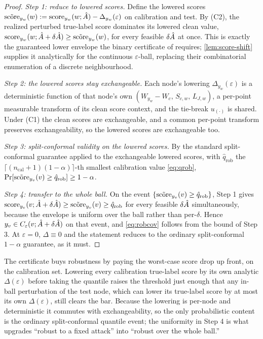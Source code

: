 \begin{proof}
\emph{Step 1: reduce to lowered scores.}
Define the lowered scores
$\tilde{\mathrm{score}}_{y_w}(w):=\mathrm{score}_{y_w}(w;\hat{A})-\Delta_{y_w}(\varepsilon)$ on calibration and test. By
(C2), the realized perturbed true-label score dominates its lowered clean value,
$\mathrm{score}_{y_w}(w;\hat{A}+\delta\hat{A})\ge\tilde{\mathrm{score}}_{y_w}(w)$, for every feasible $\delta\hat{A}$ at once.
This is exactly the guaranteed lower envelope the binary certificate of \citet{zargarbashi2023conformal}
requires; \cref{lem:score-shift} supplies it analytically for the continuous $\varepsilon$-ball,
replacing their combinatorial enumeration of a discrete neighbourhood.

\emph{Step 2: the lowered scores stay exchangeable.}
Each node's lowering $\Delta_{y_w}(\varepsilon)$ is a deterministic function of that node's own
$(W_{y_w}-W_c,\,S_{c,w},\,L_{J,w})$, a per-point measurable transform of its clean score context, and
the tie-break $u_{(\cdot)}$ is shared. Under (C1) the clean scores are exchangeable, and a common
per-point transform preserves exchangeability, so the lowered scores are exchangeable too.

\emph{Step 3: split-conformal validity on the lowered scores.}
By the standard split-conformal guarantee \citep{vovk2005algorithmic} applied to the exchangeable
lowered scores, with $\hat q_{\mathrm{rob}}$ the $\lceil(n_{\mathrm{cal}}+1)(1-\alpha)\rceil$-th smallest
calibration value \eqref{eq:qrob}, $\Pr[\tilde{\mathrm{score}}_{y_v}(v)\ge\hat q_{\mathrm{rob}}]\ge1-\alpha$.

\emph{Step 4: transfer to the whole ball.}
On the event $\{\tilde{\mathrm{score}}_{y_v}(v)\ge\hat q_{\mathrm{rob}}\}$, Step 1 gives
$\mathrm{score}_{y_v}(v;\hat{A}+\delta\hat{A})\ge\tilde{\mathrm{score}}_{y_v}(v)\ge\hat q_{\mathrm{rob}}$ for every feasible
$\delta\hat{A}$ simultaneously, because the envelope is uniform over the ball rather than per-$\delta$.
Hence $y_v\in C_\varepsilon(v;\hat{A}+\delta\hat{A})$ on that event, and \eqref{eq:robcov} follows from
the bound of Step 3. At $\varepsilon=0$, $\Delta\equiv0$ and the statement reduces to the ordinary
split-conformal $1-\alpha$ guarantee, as it must.
\end{proof}

The certificate buys robustness by paying the worst-case score drop up front, on the calibration set.
Lowering every calibration true-label score by its own analytic $\Delta(\varepsilon)$ before taking the
quantile raises the threshold just enough that any in-ball perturbation of the test node, which can
lower its true-label score by at most its own $\Delta(\varepsilon)$, still clears the bar. Because the
lowering is per-node and deterministic it commutes with exchangeability, so the only probabilistic
content is the ordinary split-conformal quantile event; the uniformity in Step 4 is what upgrades
``robust to a fixed attack'' into ``robust over the whole ball.''

